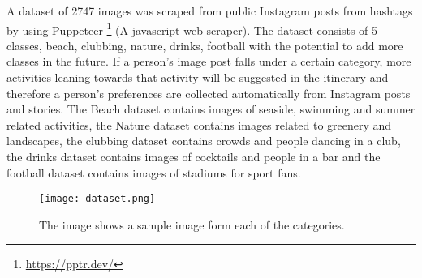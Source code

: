 A dataset of 2747 images was scraped from public Instagram posts from
hashtags by using Puppeteer \footnote{\url{https://pptr.dev/}} (A
javascript web-scraper). The dataset consists of 5 classes, beach,
clubbing, nature, drinks, football with the potential to add more
classes in the future. If a person’s image post falls under a certain
category, more activities leaning towards that activity will be
suggested in the itinerary and therefore a person’s preferences are
collected automatically from Instagram posts and stories. The Beach
dataset contains images of seaside, swimming and summer related
activities, the Nature dataset contains images related to greenery and
landscapes, the clubbing dataset contains crowds and people dancing in
a club, the drinks dataset contains images of cocktails and people in
a bar and the football dataset contains images of stadiums for sport
fans. 

    \begin{figure}[H]
        \caption{The image shows a sample image form each of the categories.}
        \centering
        \texttt{[image: dataset.png]}
        \label{dataset}
    \end{figure}